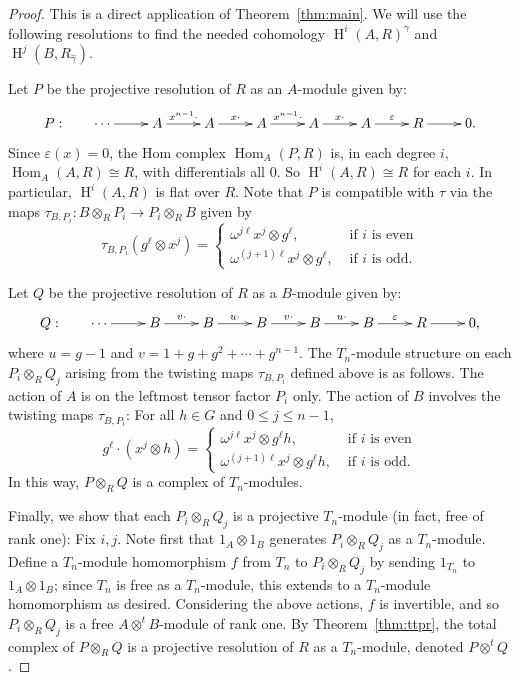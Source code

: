 \documentclass[11pt]{amsart}
\numberwithin{equation}{section}
\theoremstyle{definition}
\theoremstyle{remark}
\newcommand{\om}{\omega}
\newcommand\Homol{\operatorname{H}}
\newcommand\coh{\Homol}
\newcommand\ot{\otimes}
\newcommand\ott{\otimes^{t}\!}
\newcommand{\ttpt}{A\ott B}
\newcommand\Hom{\operatorname{Hom}}
\begin{document}
\begin{proof}
This is a direct application of Theorem~\ref{thm:main}.
We will use the following resolutions to find the needed cohomology
$\coh^i(A,R)^{\gamma}$ and $\coh^j(B, R_{\widehat{\gamma}})$.

Let $P$ be the projective resolution of $R$ as an $A$-module given by:
\begin{equation}\label{eqn:P-std}
\xymatrix{
P: \quad \quad \cdots \ar[r] &
   A\ar[r]^{x^{n-1}\cdot} &
   A\ar[r]^{x\cdot} &
   A\ar[r]^{x^{n-1}\cdot} &
   A\ar[r]^{x\cdot} &
    A \ar[r]^{\varepsilon} & R \ar[r] & 0 .
}
\end{equation}
Since $\varepsilon(x)=0$, the Hom complex
$\Hom_A (P, R)$ is, in each degree $i$, $\Hom_A(A,R)\cong R$,
with differentials all 0.
So $\coh^i(A,R) \cong R$ for each $i$.
In particular, $\coh ^i(A,R)$ is flat over $R$. 
Note that $P$ is compatible with $\tau$ via the maps
$\tau_{B,P_i}: B\ot_R P_i \rightarrow P_i\ot_R B$ given by
\[
   \tau_{B, P_i}( g^{\ell}\ot  x^j) =  \left\{
    \begin{array}{rl}
     \omega^{j\ell}x^j\ot g^{\ell} , & \mbox{ if $i$ is even}\\
    \omega^{(j+1)\ell} x^j \ot g^{\ell} , & \mbox{ if $i$ is odd} .
   \end{array}\right.
\]


Let $Q$ be the projective resolution of $R$ as a $B$-module given by:
\[
\xymatrix{
 Q: \quad \quad \cdots \ar[r]
    & B\ar[r]^{v\cdot} & 
    B\ar[r]^{u\cdot} &
    B\ar[r]^{v\cdot} &
    B\ar[r]^{u\cdot} & 
     B\ar[r]^{\varepsilon} & R \ar[r] & 0   , 
}
\]
where $u=g-1$ and $v=1+g+g^2+\cdots + g^{n-1}$. 
The $T_n$-module structure on each $P_i\ot_R Q_j$
arising from the twisting maps $\tau_{B, P_i}$ defined above is as follows. 
The action of $A$ is on the leftmost tensor factor $P_i$ only. 
The action of $B$ involves the twisting maps $\tau_{B, P_i}$:
For all $h\in G$ and $0\leq j\leq n-1$,
\begin{equation}\label{eqn:action}
  g^{\ell}\cdot (x^j\ot h) =
     \left\{\begin{array}{rl}
     \omega^{j\ell} x^j\ot g^{\ell}h, & \mbox{ if $i$ is even}\\
    \om^{(j+1)\ell} x^j\ot g^{\ell}h , & \mbox{ if $i$ is odd} .
   \end{array}\right.
\end{equation}
In this way, $P\ot_R Q$ is a complex of $T_n$-modules.

Finally, we show that each $P_i\ot_R Q_j$ is 
a projective $T_n$-module (in fact, free of rank one):
Fix $i,j$. Note first that 
$1_A\ot 1_B$ generates $P_i\ot_R Q_j$ as a $T_n$-module. 
Define a $T_n$-module homomorphism $f$ from
$T_n$ to $P_i\ot_R Q_j$ by sending $1_{T_n}$ to $1_A\ot 1_B$;
since $T_n$ is free as a $T_n$-module, 
this extends to a $T_n$-module homomorphism as desired.
Considering the above actions, $f$ is invertible, and so $P_i\ot_R Q_j$
is a free $\ttpt$-module of rank one. 
By Theorem~\ref{thm:ttpr}, the total complex of $P\ot_R Q$ is a projective resolution
of $R$ as a $T_n$-module, denoted $P\ott Q$. 


\end{proof}
\end{document}
